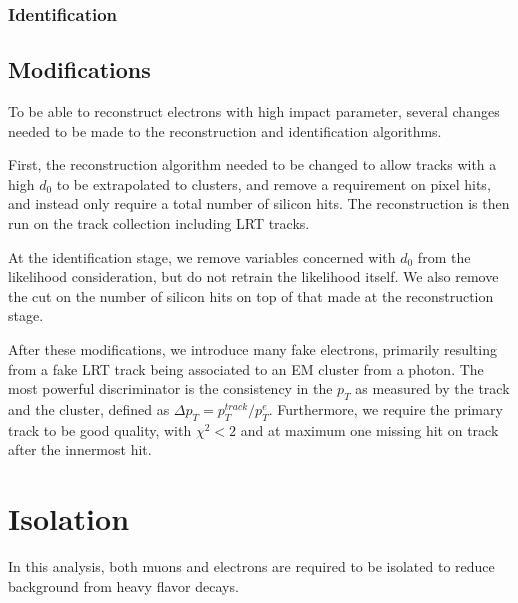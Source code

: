 
\subsubsection{Identification}


\subsection{Modifications}
To be able to reconstruct electrons with high impact parameter, several changes needed to be made to the reconstruction and identification algorithms. 

First, the reconstruction algorithm needed to be changed to allow tracks with a high $d_{0}$ to be extrapolated to clusters, and remove a requirement on pixel hits, and instead only require a total number of silicon hits. The reconstruction is then run on the track collection including \ac{LRT} tracks. 

At the identification stage, we remove variables concerned with $d_{0}$ from the likelihood consideration, but do not retrain the likelihood itself. We also remove the cut on the number of silicon hits on top of that made at the reconstruction stage. 

After these modifications, we introduce many fake electrons, primarily resulting from a fake \ac{LRT} track being associated to an \ac{EM} cluster from a photon. The most powerful discriminator is the consistency in the $p_{T}$ as measured by the track and the cluster, defined as $\Delta p_{T} = p_{T}^{track}/p_{T}^{e}$. Furthermore, we require the primary track to be good quality, with $\chi^{2} < 2$ and at maximum one missing hit on track after the innermost hit. 






\section{Isolation}
In this analysis, both muons and electrons are required to be isolated to reduce background from heavy flavor decays. 




